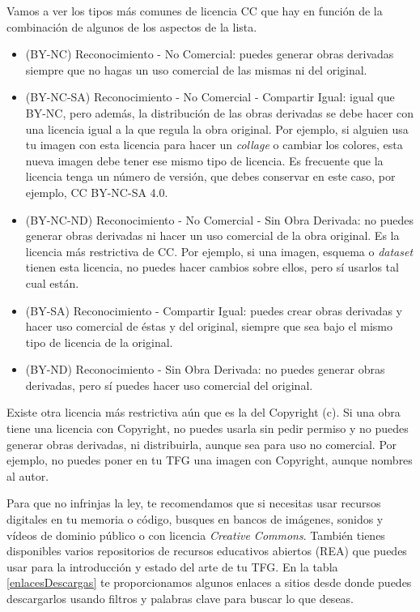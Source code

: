 Vamos a ver los tipos más comunes de licencia CC que hay en función de la combinación de algunos de los aspectos de la lista.
\begin{itemize}
    \item (BY-NC) Reconocimiento - No Comercial: puedes generar obras derivadas siempre que no hagas un uso comercial de las mismas ni del original. 
    \item (BY-NC-SA) Reconocimiento - No Comercial - Compartir Igual: igual que BY-NC, pero además, la distribución de las obras derivadas se debe hacer con una licencia igual a la que regula la obra original. Por ejemplo, si alguien usa tu imagen con esta licencia para hacer un \textit{collage} o cambiar los colores, esta nueva imagen debe tener ese mismo tipo de licencia. Es frecuente que la licencia tenga un número de versión, que debes conservar en este caso, por ejemplo, CC BY-NC-SA 4.0.
    \item (BY-NC-ND) Reconocimiento - No Comercial - Sin Obra Derivada:  no puedes generar obras derivadas ni hacer un uso comercial de la obra original. Es la licencia más restrictiva de CC. Por ejemplo, si una imagen, esquema o \textit{dataset} tienen esta licencia, no puedes hacer cambios sobre ellos, pero sí usarlos tal cual están.
    \item (BY-SA) Reconocimiento - Compartir Igual: puedes crear obras derivadas y hacer uso comercial de éstas y del original, siempre que sea bajo el mismo tipo de licencia de la original.
    \item  (BY-ND) Reconocimiento - Sin Obra Derivada: no puedes generar obras derivadas, pero sí puedes hacer uso comercial del original. 
\end{itemize}

Existe otra licencia más restrictiva aún que es la del Copyright (c). Si una obra tiene una licencia con Copyright, no puedes usarla sin pedir permiso y no puedes generar obras derivadas, ni distribuirla, aunque sea para uso no comercial. Por ejemplo, no puedes poner en tu TFG una imagen con Copyright, aunque nombres al autor. 

Para que no infrinjas la ley, te recomendamos que si necesitas usar recursos digitales en tu memoria o código, busques en bancos de imágenes, sonidos y vídeos de dominio público o con licencia \textit{Creative Commons}. También tienes disponibles varios repositorios de recursos educativos abiertos (REA) que puedes usar para la introducción y estado del arte de tu TFG. En la tabla \ref{enlacesDescargas} te proporcionamos algunos enlaces a sitios desde donde puedes descargarlos usando filtros y palabras clave para buscar lo que deseas.


